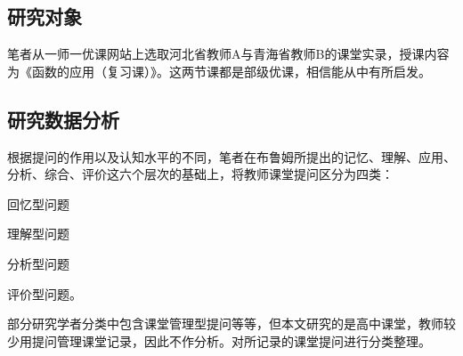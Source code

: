 \subsection{研究对象}

笔者从一师一优课网站上选取河北省教师A与青海省教师B的课堂实录，授课内容为《函数的应用（复习课）》。这两节课都是部级优课，相信能从中有所启发。


\subsection{研究数据分析}

根据提问的作用以及认知水平的不同，笔者在布鲁姆所提出的记忆、理解、应用、分析、综合、评价这六个层次的基础上，将教师课堂提问区分为四类：
\begin{enumerate*}
  \item 回忆型问题
  \item 理解型问题
  \item 分析型问题
  \item 评价型问题。
\end{enumerate*}
部分研究学者分类中包含课堂管理型提问等等，但本文研究的是高中课堂，教师较少用提问管理课堂记录，因此不作分析。对所记录的课堂提问进行分类整理。
